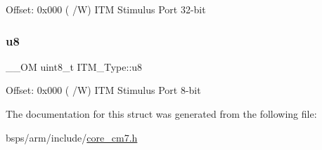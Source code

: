 Offset\+: 0x000 ( /W) I\+TM Stimulus Port 32-\/bit \mbox{\label{structITM__Type_ae773bf9f9dac64e6c28b14aa39f74275}} 
\subsubsection{\texorpdfstring{u8}{u8}}
{\footnotesize\ttfamily \+\_\+\+\_\+\+OM uint8\+\_\+t I\+T\+M\+\_\+\+Type\+::u8}

Offset\+: 0x000 ( /W) I\+TM Stimulus Port 8-\/bit 

The documentation for this struct was generated from the following file\+:\begin{DoxyCompactItemize}
\item 
bsps/arm/include/\mbox{\hyperlink{core__cm7_8h}{core\+\_\+cm7.\+h}}\end{DoxyCompactItemize}
